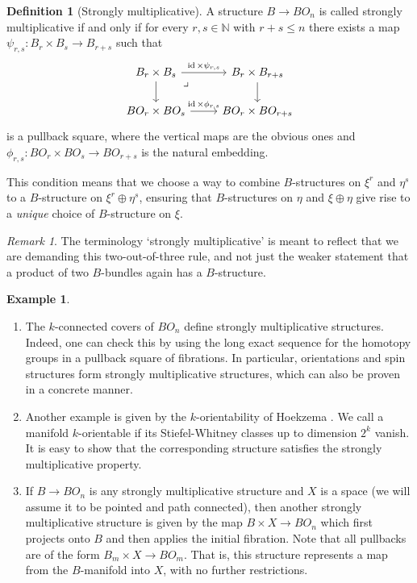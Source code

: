 \documentclass{amsart}
\theoremstyle{definition}
\newtheorem{ex}[thm]{Example}
\newtheorem{defi}[thm]{Definition}
\theoremstyle{remark}
\newtheorem*{rmk}{Remark}
\newcommand{\N}{\mathbb{N}}
\newcommand{\id}{\operatorname{id}}
\begin{document}
\begin{defi}[Strongly multiplicative]
   A structure $B\to BO_n$ is called strongly multiplicative if and only if for every $r,s\in\N$ with $r+s\leq n$ there exists a map $\psi_{r,s}:B_r\times B_s\to B_{r+s}$ such that
   \[\begin{tikzcd}
B_r\times B_s \arrow[r, "{\id\times\psi_{r,s}}"] \arrow[d] \arrow[dr, phantom, "\lrcorner", very near start] & B_r\times B_{r+s} \arrow[d] \\
BO_r\times BO_s \arrow[r, "{\id\times\phi_{r,s}}"]         & BO_r\times BO_{r+s}        
\end{tikzcd}\]
is a pullback square, where the vertical maps are the obvious ones and $\phi_{r,s}:BO_r\times BO_s\to BO_{r+s}$ is the natural embedding.
\end{defi}

This condition means that we choose a way to combine $B$-structures on $\xi^r$ and $\eta^s$ to a $B$-structure on $\xi^r\oplus\eta^s$, ensuring that $B$-structures on $\eta$ and $\xi\oplus\eta$ give rise to a \textit{unique} choice of $B$-structure on $\xi$.

\begin{rmk}
    The terminology `strongly multiplicative' is meant to reflect that we are demanding this two-out-of-three rule, and not just the weaker statement that a product of two $B$-bundles again has a $B$-structure. 
\end{rmk}

\begin{ex}
\label{example-structures}
    \begin{enumerate}
        \item The $k$-connected covers of $BO_n$ define strongly multiplicative structures. Indeed, one can check this by using the long exact sequence for the homotopy groups in a pullback square of fibrations. In particular, orientations and spin structures form strongly multiplicative structures, which can also be proven in a concrete manner.
        \item Another example is given by the $k$-orientability of Hoekzema \cite{Hoekzema_2018}. We call a manifold $k$-orientable if its Stiefel-Whitney classes up to dimension $2^k$ vanish. It is easy to show that the corresponding structure satisfies the strongly multiplicative property.
        \item If $B\to BO_n$ is any strongly multiplicative structure and $X$ is a space (we will assume it to be pointed and path connected), then another strongly multiplicative structure is given by the map $B\times X\to BO_n$ which first projects onto $B$ and then applies the initial fibration. Note that all pullbacks are of the form $B_m\times X\to BO_m$. That is, this structure represents a map from the $B$-manifold into $X$, with no further restrictions.
    \end{enumerate}
\end{ex}
\end{document}
